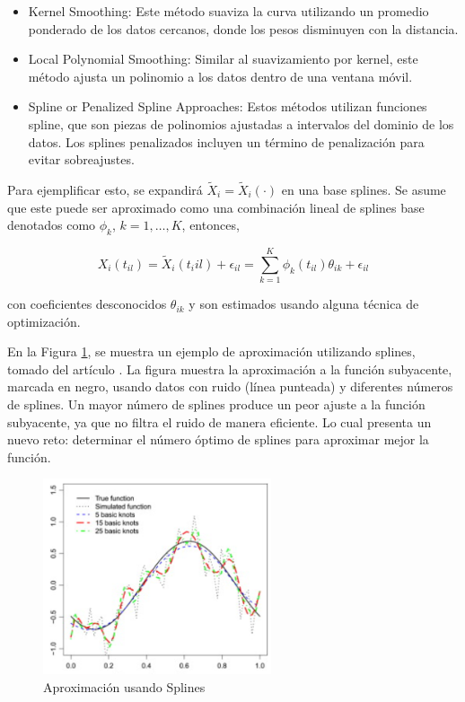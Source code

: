 \begin{itemize}
    \item Kernel Smoothing: Este método suaviza la curva utilizando un promedio ponderado de los datos cercanos, donde los pesos disminuyen con la distancia.

    \item Local Polynomial Smoothing: Similar al suavizamiento por kernel, este método ajusta un polinomio a los datos dentro de una ventana móvil. 

    \item Spline or Penalized Spline Approaches: Estos métodos utilizan funciones spline, que son piezas de polinomios ajustadas a intervalos del dominio de los datos. Los splines penalizados incluyen un término de penalización para evitar sobreajustes.
\end{itemize}

Para ejemplificar esto, se expandirá $\widetilde{X}_i = \widetilde{X}_i(\cdot)$ en una base splines. Se asume que este puede ser aproximado como una combinación lineal de splines base denotados como $\phi_{k}$, $k = 1, \dots, K$, entonces,

\begin{equation}
     X_i(t_{il}) = \widetilde{X}_i(t_i{il}) + \epsilon_{il} = \sum_{k = 1}^{K}\phi_k(t_{il})\theta_{ik} + \epsilon_{il}
\end{equation}

con coeficientes desconocidos $\theta_{ik}$ y son estimados usando alguna técnica de optimización. 

En la Figura \ref{fig:ejSpline}, se muestra un ejemplo de aproximación utilizando splines, tomado del artículo \cite{Aguilera2013}. La figura muestra la aproximación a la función subyacente, marcada en negro, usando datos con ruido (línea punteada) y diferentes números de splines. Un mayor número de splines produce un peor ajuste a la función subyacente, ya que no filtra el ruido de manera eficiente. Lo cual presenta un nuevo reto: determinar el número óptimo de splines para aproximar mejor la función.

\begin{figure}[H]
    \centering
    \includegraphics[width = 0.6\textwidth ]{Imagenes/splineEj.png}
    \caption{Aproximación usando Splines}
    \label{fig:ejSpline}
\end{figure}


